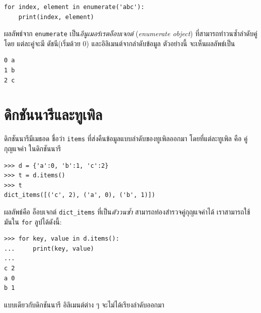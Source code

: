 \begin{verbatim}
for index, element in enumerate('abc'):
    print(index, element)
\end{verbatim}
%
%
ผลลัพธ์จาก \texttt{enumerate} เป็น\textit{อีนูเมอร์เรตอ็อบเจกต์} (\textit{enumerate object}) ที่สามารถทำวนซ้ำลำดับคู่ 
โดย แต่ละคู่จะมี ดัชนี(เริ่มด้วย 0) และอิลิเมนต์จากลำดับข้อมูล
ตัวอย่างนี้ จะเห็นผลลัพธ์เป็น
%
\begin{verbatim}
0 a
1 b
2 c
\end{verbatim}
%


\section{ดิกชันนารีและทูเพิล}
\label{dictuple}

%
ดิกชันนารีมีเมธอด ชื่อว่า \texttt{items} ที่ส่งคืนข้อมูลแบบลำดับของทูเพิลออกมา
โดยที่แต่ละทูเพิล คือ คู่กุญแจค่า ในดิกชันนารี

\begin{verbatim}
>>> d = {'a':0, 'b':1, 'c':2}
>>> t = d.items()
>>> t
dict_items([('c', 2), ('a', 0), ('b', 1)])
\end{verbatim}
%
%
ผลลัพธ์คือ อ็อบเจกต์ \verb|dict_items|
ที่เป็น\textit{ตัววนซ้ำ} สามารถท่องสำรวจคู่กุญแจค่าได้
เราสามารถใช้มันใน \texttt{for} ลูปได้ดังนี้:
%

\begin{verbatim}
>>> for key, value in d.items():
...     print(key, value)
...
c 2
a 0
b 1
\end{verbatim}
%
%
แบบเดียวกับดิกชันนารี อิลิเมนต์ต่าง ๆ จะไม่ได้เรียงลำดับออกมา

